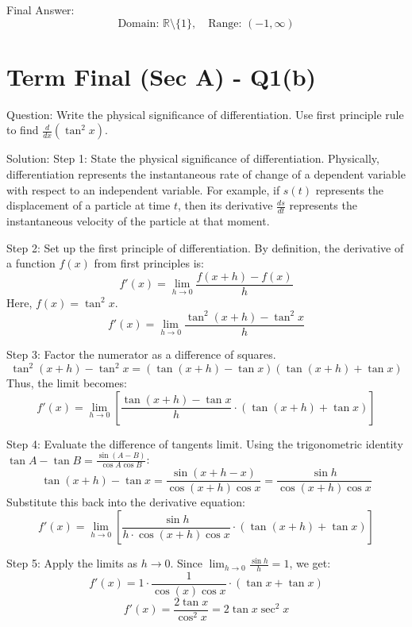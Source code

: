 \documentclass[11pt, a4paper]{article}
\begin{document}
Final Answer:
$$
\boxed{\text{Domain: } \mathbb{R} \setminus \{1\}, \quad \text{Range: } (-1, \infty)}
$$


\section*{Term Final (Sec A) - Q1(b)}
Question:
Write the physical significance of differentiation. Use first principle rule to find $\frac{d}{dx}(\tan^2 x)$.

Solution:
Step 1: State the physical significance of differentiation.
Physically, differentiation represents the instantaneous rate of change of a dependent variable with respect to an independent variable. For example, if $s(t)$ represents the displacement of a particle at time $t$, then its derivative $\frac{ds}{dt}$ represents the instantaneous velocity of the particle at that moment.

Step 2: Set up the first principle of differentiation.
By definition, the derivative of a function $f(x)$ from first principles is:
$$f'(x) = \lim_{h \to 0} \frac{f(x+h) - f(x)}{h}$$
Here, $f(x) = \tan^2 x$.
$$f'(x) = \lim_{h \to 0} \frac{\tan^2(x+h) - \tan^2 x}{h}$$

Step 3: Factor the numerator as a difference of squares.
$$\tan^2(x+h) - \tan^2 x = \left(\tan(x+h) - \tan x\right)\left(\tan(x+h) + \tan x\right)$$
Thus, the limit becomes:
$$f'(x) = \lim_{h \to 0} \left[ \frac{\tan(x+h) - \tan x}{h} \cdot \left(\tan(x+h) + \tan x\right) \right]$$

Step 4: Evaluate the difference of tangents limit.
Using the trigonometric identity $\tan A - \tan B = \frac{\sin(A-B)}{\cos A \cos B}$:
$$\tan(x+h) - \tan x = \frac{\sin(x+h-x)}{\cos(x+h)\cos x} = \frac{\sin h}{\cos(x+h)\cos x}$$
Substitute this back into the derivative equation:
$$f'(x) = \lim_{h \to 0} \left[ \frac{\sin h}{h \cdot \cos(x+h)\cos x} \cdot \left(\tan(x+h) + \tan x\right) \right]$$

Step 5: Apply the limits as $h \to 0$.
Since $\lim_{h \to 0} \frac{\sin h}{h} = 1$, we get:
$$f'(x) = 1 \cdot \frac{1}{\cos(x)\cos x} \cdot (\tan x + \tan x)$$
$$f'(x) = \frac{2\tan x}{\cos^2 x} = 2 \tan x \sec^2 x$$
\end{document}
